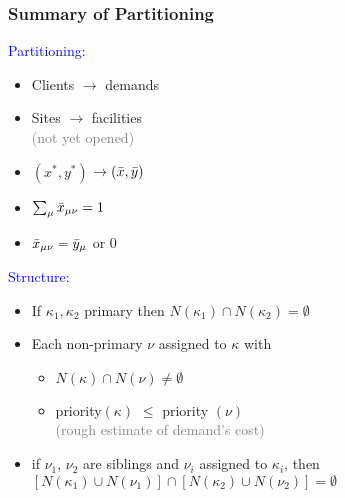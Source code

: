 \documentclass[hyperref,dvipsnames,svgnames,compress]{beamer}
\begin{document}
\begin{frame}
  \frametitle{Summary of Partitioning}

\begin{minipage}{2in}
\noindent \textcolor{blue}{Partitioning:}
\noindent
\begin{itemize}\addtolength{\itemsep}{0.5\baselineskip}
	\item Clients $\rightarrow$ demands
	\item Sites $\rightarrow$ facilities
			\\ \textcolor{gray}{(not yet opened)}
	\item $(x^\ast,y^\ast)$ $\rightarrow ({\bar x},{\bar y})$
	\item $\sum_{\mu}{\bar x}_{\mu\nu} = 1$
	\item ${\bar x}_{\mu\nu} = {\bar y}_\mu$ or $0$
\end{itemize}
\vspace{0.4in}{\ }
\end{minipage}
\hspace{-0.5in}
\pause
\begin{minipage}{2.6in}
\noindent \textcolor{blue}{Structure:}
\noindent
  \begin{itemize}\addtolength{\itemsep}{1\baselineskip}
  \item If $\kappa_1,\kappa_2$ primary then $N(\kappa_1)\cap N(\kappa_2) = \emptyset$
  \item Each non-primary $\nu$ assigned to $\kappa$ with 
	\begin{itemize}
		\item $N(\kappa)\cap N(\nu) \neq \emptyset$
		\item priority$(\kappa)$ $\le$ priority $(\nu)$
		\\
		\textcolor{gray}{(rough estimate of demand's cost)}
	\end{itemize}
  \item if $\nu_1$, $\nu_2$ are siblings and 
		$\nu_i$ assigned to $\kappa_i$, then
		$[N(\kappa_1) \cup N(\nu_1)] \cap [N(\kappa_2) \cup N(\nu_2)] = \emptyset$
  \end{itemize}
\end{minipage}
\end{frame}



\end{document}
